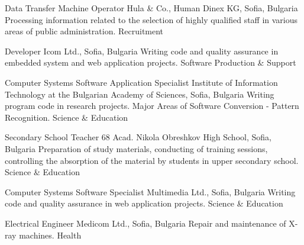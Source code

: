 \documentclass[english,a4paper]{europasscv}
\begin{document}
\begin{europasscv}
   {Data Transfer Machine Operator}
  \ecvitem {} {Hula \& Co., Human Dinex KG, Sofia, Bulgaria}
  \ecvitem {} {Processing information related to the selection of highly qualified staff in various areas of public administration.}
  \ecvitem {} { \quad Recruitment}
  
   {Developer}
  \ecvitem {} {Icom Ltd., Sofia, Bulgaria}
  \ecvitem {} {Writing code and quality assurance in embedded system and web application projects.}
  \ecvitem {} { \quad Software Production \& Support}

   {Computer Systems Software Application Specialist}
  \ecvitem {} {Institute of Information Technology at the Bulgarian Academy of Sciences, Sofia, Bulgaria}
  \ecvitem {} {Writing program code in research projects. Major Areas of Software Conversion - Pattern Recognition.}
  \ecvitem {} { \quad Science \& Education}
  
   {Secondary School Teacher}
  \ecvitem {} {68 Acad. Nikola Obreshkov High School, Sofia, Bulgaria}
  \ecvitem {} {Preparation of study materials, conducting of training sessions, controlling the absorption of the material by students in upper secondary school.}
  \ecvitem {} { \quad Science \& Education}
  
   {Computer Systems Software Specialist}
  \ecvitem {} {Multimedia Ltd., Sofia, Bulgaria}
  \ecvitem {} {Writing code and quality assurance in web application projects.}
  \ecvitem {} { \quad Science \& Education}
  
   {Electrical Engineer}
  \ecvitem {} {Medicom Ltd., Sofia, Bulgaria}
  \ecvitem {} {Repair and maintenance of X-ray machines.}
  \ecvitem {} { \quad Health}
  
  
  
  
  

\end{europasscv}
\end{document}
